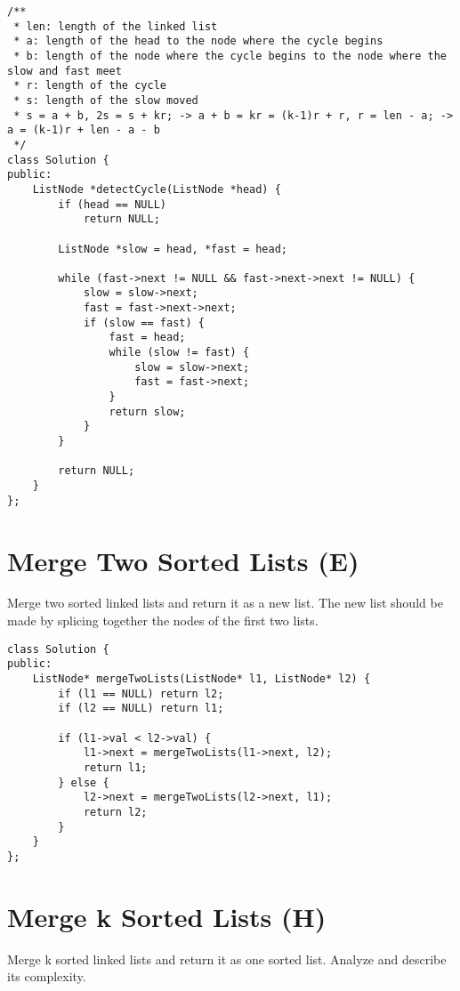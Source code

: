 \begin{lstlisting}
/** 
 * len: length of the linked list
 * a: length of the head to the node where the cycle begins
 * b: length of the node where the cycle begins to the node where the slow and fast meet
 * r: length of the cycle
 * s: length of the slow moved
 * s = a + b, 2s = s + kr; -> a + b = kr = (k-1)r + r, r = len - a; -> a = (k-1)r + len - a - b
 */
class Solution {
public:
    ListNode *detectCycle(ListNode *head) {
        if (head == NULL)
            return NULL;

        ListNode *slow = head, *fast = head;
        
        while (fast->next != NULL && fast->next->next != NULL) {
            slow = slow->next;
            fast = fast->next->next;
            if (slow == fast) {
                fast = head;
                while (slow != fast) {
                    slow = slow->next;
                    fast = fast->next;
                }
                return slow;
            }
        }
        
        return NULL;
    }
};
\end{lstlisting}


\section{Merge Two Sorted Lists (E)}
Merge two sorted linked lists and return it as a new list. The new list should be made by splicing together the nodes of the first two lists.\\

\begin{lstlisting}
class Solution {
public:
    ListNode* mergeTwoLists(ListNode* l1, ListNode* l2) {
        if (l1 == NULL) return l2;
        if (l2 == NULL) return l1;
        
        if (l1->val < l2->val) {
            l1->next = mergeTwoLists(l1->next, l2);
            return l1;
        } else {
            l2->next = mergeTwoLists(l2->next, l1);
            return l2;
        }
    }
};
\end{lstlisting}


\section{Merge k Sorted Lists (H)}
Merge k sorted linked lists and return it as one sorted list. Analyze and describe its complexity. \\
 
